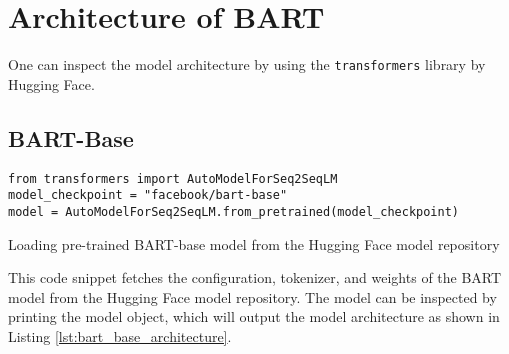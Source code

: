 \chapter{Architecture of BART}
    \label{appendix:BART}
    One can inspect the model architecture by using the \texttt{transformers} library by Hugging Face.
    \section*{BART-Base}
    \begin{listing}[H]
        \begin{verbatim}
from transformers import AutoModelForSeq2SeqLM
model_checkpoint = "facebook/bart-base"
model = AutoModelForSeq2SeqLM.from_pretrained(model_checkpoint)
        \end{verbatim}
        \caption{Loading pre-trained BART-base model from the Hugging Face model repository}
        \label{lst:bart_base_fetch}
    \end{listing}
    This code snippet fetches the configuration, tokenizer, and weights of the BART model from the Hugging Face model repository. The model can be inspected by printing the model object, which will output the model architecture as shown in Listing \ref{lst:bart_base_architecture}.
    \newpage

